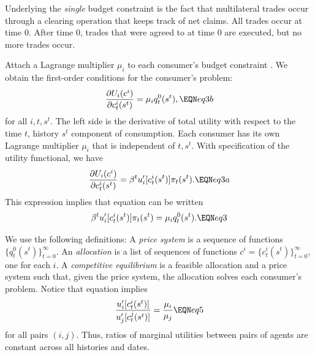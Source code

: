 Underlying the {\it single\/}  budget constraint  is the
fact that multilateral   trades occur through a clearing
operation that keeps track of net claims.
All trades occur at time $0$.  After time $0$, trades that
were agreed to at time $0$ are executed, but no more trades occur.


Attach a Lagrange multiplier $\mu_i$ to each consumer's  budget constraint  .
We obtain the
first-order conditions for the consumer's problem:
$$  {\partial U_i(c^i) \over \partial c_t^i(s^t)} = \mu_i q_t^0(s^t), \EQN eq3b $$
for all $i, t, s^t$.
The left side is the derivative of total utility with respect to
the time $t$, history $s^t$ component of consumption.  Each
consumer has its own Lagrange multiplier $\mu_i$ that is independent of $t, s^t$. With specification  of the utility functional,
we have
$$ {\partial U_i(c^i) \over \partial c_t^i(s^t)} =   \beta^t
 u'_i[c_t^i(s^t)] \pi_t(s^t) .  \EQN eq3a $$
This expression  implies that equation  can be written
$$ \beta^t u'_i[c_t^i(s^t)] \pi_t(s^t) = \mu_i q_t^0(s^t). \EQN eq3 $$


We use the following  definitions:
\medskip
{}   A {\it price system} is a sequence of
functions $\{q_t^0(s^t)\}_{t=0}^\infty$.  An {\it allocation} is
a list of sequences of functions $c^i=\{c_t^i(s^t)\}_{t=0}^\infty$,
 one for each $i$.
\medskip
{} A {\it competitive equilibrium} is
a feasible allocation and a price system such that, given
the price system,  the allocation solves
each consumer's problem.
\medskip
Notice that equation  implies
$$ {u'_i[c_t^i(s^t)] \over
 u'_j[c_t^j(s^t)] }
 = {\mu_i\over \mu_j}          \EQN eq5 $$
for all pairs $(i,j)$.
Thus, ratios of marginal utilities between pairs of agents are
constant across all histories and dates.


